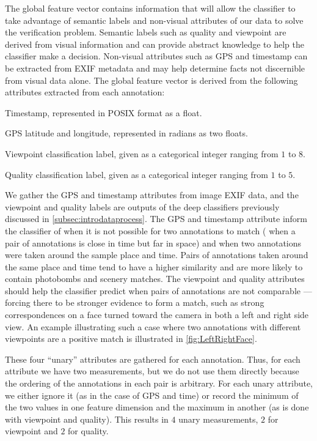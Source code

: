 The global feature vector contains information that will allow the classifier to take advantage of semantic
  labels and non-visual attributes of our data to solve the verification problem.
Semantic labels such as quality and viewpoint are derived from visual information and can provide abstract
  knowledge to help the classifier make a decision.
Non-visual attributes such as GPS and timestamp can be extracted from EXIF metadata and may help determine facts
  not discernible from visual data alone.
The global feature vector is derived from the following attributes extracted from each annotation:
\begin{enumln}

    \item Timestamp, represented in POSIX format as a float.

    \item GPS latitude and longitude, represented in radians as two floats. 

    \item Viewpoint classification label, given as a categorical integer ranging from $1$ to $8$.

    \item Quality classification label, given as a categorical integer ranging from $1$ to $5$.
\end{enumln}
We gather the GPS and timestamp attributes from image EXIF data, and the viewpoint and quality labels are outputs
  of the deep classifiers previously discussed in \cref{subsec:introdataprocess}.
The GPS and timestamp attribute inform the classifier of when it is not possible for two annotations to match
  (\eg{} when a pair of annotations is close in time but far in space) and when two annotations were taken around
  the sample place and time.
Pairs of annotations taken around the same place and time tend to have a higher similarity and are more likely to
  contain photobombs and scenery matches.
The viewpoint and quality attributes should help the classifier predict when pairs of annotations are not
  comparable --- forcing there to be stronger evidence to form a match, such as strong correspondences on a face
  turned toward the camera in both a left and right side view.
An example illustrating such a case where two annotations with different viewpoints are a positive match is
  illustrated in \cref{fig:LeftRightFace}.

\LeftRightFace{}

These four ``unary'' attributes are gathered for each annotation.
Thus, for each attribute we have two measurements, but we do not use them directly because the ordering of the
  annotations in each pair is arbitrary.
For each unary attribute, we either ignore it (as in the case of GPS and time) or record the minimum of the two
  values in one feature dimension and the maximum in another (as is done with viewpoint and quality).
This results in $4$ unary measurements, $2$ for viewpoint and $2$ for quality.

